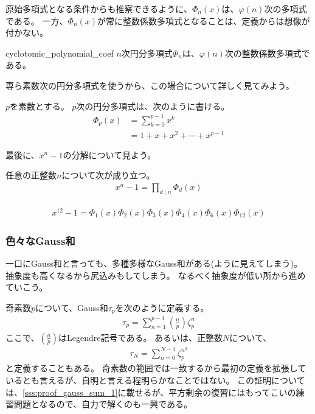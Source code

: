 原始多項式となる条件からも推察できるように、$\Phi_n(x)$は、$\varphi(n)$次の多項式である。
一方、$\Phi_n(x)$が常に整数係数多項式となることは、定義からは想像が付かない。

\begin{Prop}{}{cyclotomic_polynomial_coef}
$n$次円分多項式$\Phi_n$は、$\varphi(n)$次の整数係数多項式である。
\end{Prop}

専ら素数次の円分多項式を使うから、この場合について詳しく見てみよう。

\begin{Prop}{}{}
$p$を素数とする。
$p$次の円分多項式は、次のように書ける。
\begin{align*}
\Phi_p(x) &= \sum_{k=0}^{p-1}x^k\\
&= 1 + x + x^2 + \cdots + x^{p-1}
\end{align*}
\end{Prop}

最後に、$x^n-1$の分解について見よう。

\begin{Prop}{}{}
任意の正整数$n$について次が成り立つ。
\begin{align*}
x^n-1 = \prod_{d\mid n} \Phi_d(x)
\end{align*}
\end{Prop}

\begin{Exam}{}{}\;
\begin{align*}
x^{12}-1 = \Phi_1(x)\Phi_2(x)\Phi_3(x)\Phi_4(x)\Phi_6(x)\Phi_{12}(x)
\end{align*}
\end{Exam}

\subsubsection{色々なGauss和}
一口にGauss和と言っても、多種多様なGauss和がある(ように見えてしまう)。
抽象度も高くなるから尻込みもしてしまう。
なるべく抽象度が低い所から進めていこう。

奇素数$p$について、Gauss和$\tau_p$を次のように定義する。
\begin{align}\label{eq:tau_p1}
\tau_p = \sum_{n=1}^{p-1} \left(\frac{n}{p}\right) \zeta_p^n
\end{align}
ここで、$\left(\frac{a}{p}\right)$はLegendre記号である。
あるいは、正整数$N$について、
\begin{align}\label{eq:tau_p2}
\tau_N = \sum_{n=0}^{N-1} \zeta_p^{n^2}
\end{align}
と定義することもある。
奇素数の範囲では一致するから最初の定義を拡張しているとも言えるが、自明と言える程明らかなことではない。
この証明については、\ref{sss:proof_gauss_sum_1}に載せるが、平方剰余の復習にはもってこいの練習問題となるので、自力で解くのも一興である。

